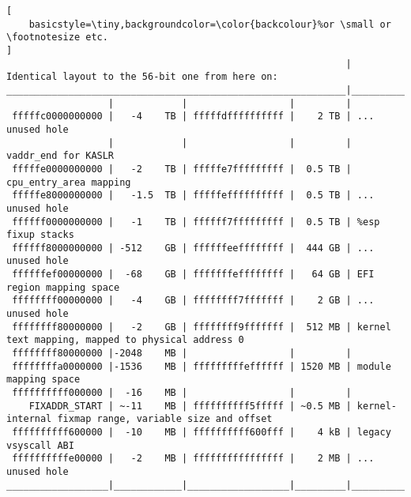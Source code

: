 \documentclass[a4paper,10pt]{article}
\begin{document}
\begin{flushleft}
\begin{lstlisting}[
    basicstyle=\tiny,backgroundcolor=\color{backcolour}%or \small or \footnotesize etc.
]
                                                            | Identical layout to the 56-bit one from here on:
____________________________________________________________|____________________________________________________________
                  |            |                  |         |
 fffffc0000000000 |   -4    TB | fffffdffffffffff |    2 TB | ... unused hole
                  |            |                  |         | vaddr_end for KASLR
 fffffe0000000000 |   -2    TB | fffffe7fffffffff |  0.5 TB | cpu_entry_area mapping
 fffffe8000000000 |   -1.5  TB | fffffeffffffffff |  0.5 TB | ... unused hole
 ffffff0000000000 |   -1    TB | ffffff7fffffffff |  0.5 TB | %esp fixup stacks
 ffffff8000000000 | -512    GB | ffffffeeffffffff |  444 GB | ... unused hole
 ffffffef00000000 |  -68    GB | fffffffeffffffff |   64 GB | EFI region mapping space
 ffffffff00000000 |   -4    GB | ffffffff7fffffff |    2 GB | ... unused hole
 ffffffff80000000 |   -2    GB | ffffffff9fffffff |  512 MB | kernel text mapping, mapped to physical address 0
 ffffffff80000000 |-2048    MB |                  |         |
 ffffffffa0000000 |-1536    MB | fffffffffeffffff | 1520 MB | module mapping space
 ffffffffff000000 |  -16    MB |                  |         |
    FIXADDR_START | ~-11    MB | ffffffffff5fffff | ~0.5 MB | kernel-internal fixmap range, variable size and offset
 ffffffffff600000 |  -10    MB | ffffffffff600fff |    4 kB | legacy vsyscall ABI
 ffffffffffe00000 |   -2    MB | ffffffffffffffff |    2 MB | ... unused hole
__________________|____________|__________________|_________|___________________________________________________________
\end{lstlisting}


\end{flushleft}
\end{document}
